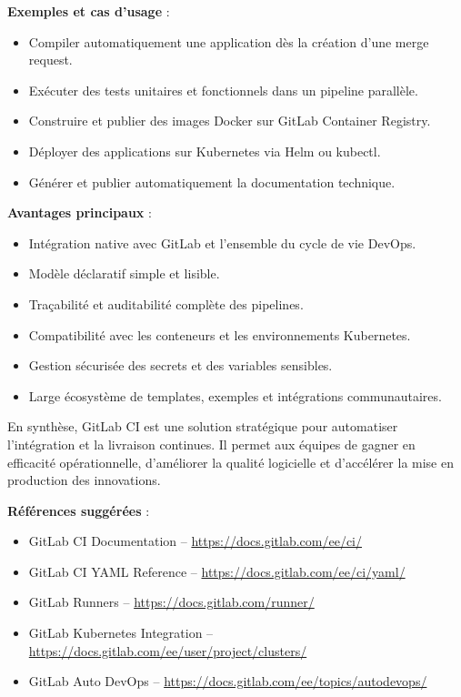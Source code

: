 \textbf{Exemples et cas d’usage} :
\begin{itemize}
	\item Compiler automatiquement une application dès la création d’une merge request.
	\item Exécuter des tests unitaires et fonctionnels dans un pipeline parallèle.
	\item Construire et publier des images Docker sur GitLab Container Registry.
	\item Déployer des applications sur Kubernetes via Helm ou kubectl.
	\item Générer et publier automatiquement la documentation technique.
\end{itemize}

\textbf{Avantages principaux} :
\begin{itemize}
	\item Intégration native avec GitLab et l’ensemble du cycle de vie DevOps.
	\item Modèle déclaratif simple et lisible.
	\item Traçabilité et auditabilité complète des pipelines.
	\item Compatibilité avec les conteneurs et les environnements Kubernetes.
	\item Gestion sécurisée des secrets et des variables sensibles.
	\item Large écosystème de templates, exemples et intégrations communautaires.
\end{itemize}

En synthèse, GitLab CI est une solution stratégique pour automatiser l’intégration et la livraison continues. Il permet aux équipes de gagner en efficacité opérationnelle, d’améliorer la qualité logicielle et d’accélérer la mise en production des innovations.

\textbf{Références suggérées} :
\begin{itemize}
	\item GitLab CI Documentation – \url{https://docs.gitlab.com/ee/ci/}
	\item GitLab CI YAML Reference – \url{https://docs.gitlab.com/ee/ci/yaml/}
	\item GitLab Runners – \url{https://docs.gitlab.com/runner/}
	\item GitLab Kubernetes Integration – \url{https://docs.gitlab.com/ee/user/project/clusters/}
	\item GitLab Auto DevOps – \url{https://docs.gitlab.com/ee/topics/autodevops/}
\end{itemize}

